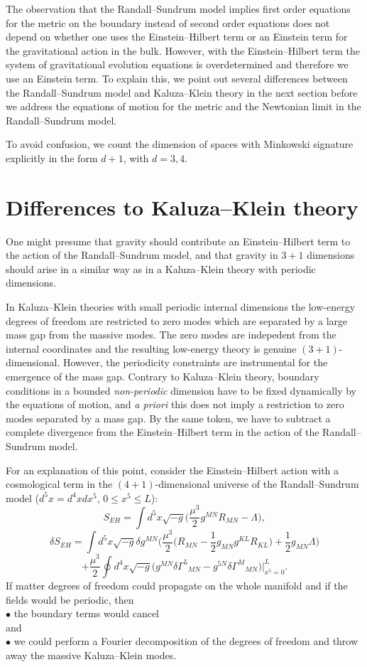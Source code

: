 \documentclass[12pt,fleqn]{article}
\newcommand{\be}{\begin{equation}}
\newcommand{\ee}{\end{equation}}
\begin{document}
The observation that the Randall--Sundrum model implies first order
equations for the metric on the boundary instead of second order
equations does not depend on whether one uses the Einstein--Hilbert
term or an Einstein term for the gravitational action in the bulk.
However, with the Einstein--Hilbert term the system of gravitational
evolution equations is overdetermined and therefore we use an Einstein
term. To explain this, we point out several differences
between the Randall--Sundrum model and Kaluza--Klein theory
in the next section before we address the equations
of motion for the metric and the Newtonian limit
in the Randall--Sundrum model.

To avoid confusion,
we count the dimension of spaces with Minkowski
signature explicitly in the form $d+1$, with $d=3,4$. 

\section{Differences to Kaluza--Klein theory}

One might presume that gravity should contribute an
Einstein--Hilbert term to the action of the Randall--Sundrum model,
and that 
 gravity in $3+1$ dimensions should arise 
in a similar way as in a Kaluza--Klein
theory with periodic dimensions.

In
Kaluza--Klein theories with small
periodic internal dimensions the low-energy degrees of freedom are restricted
to zero modes which are separated by a large mass gap from
the massive modes. 
The zero modes are indepedent from the internal coordinates
and the resulting low-energy theory is genuine $(3+1)$-dimensional.
However,
the periodicity constraints are instrumental
for the emergence of the mass gap. Contrary
to Kaluza--Klein theory, boundary conditions
in a bounded {\sl non-periodic} dimension have to be fixed
dynamically by the equations of motion, and {\it a priori} 
this does not imply
a restriction to zero modes separated by a mass gap.
By the same token, we have to subtract a complete divergence
from the Einstein--Hilbert term in the action of the
Randall--Sundrum model.

 For an explanation of this point, consider
the Einstein--Hilbert action with a cosmological term
in the $(4+1)$-dimensional universe
of the Randall--Sundrum model ($d^5x=d^4xdx^5$, $0\le x^5\le L$):
\[
S_{EH}=\int d^5x\sqrt{-g}\Big(\frac{\mu^3}{2}g^{MN}R_{MN}-\Lambda\Big),
\]
\be\label{dseh}
\delta S_{EH}=\int d^5x\sqrt{-g}\delta g^{MN}
\Bigg(\frac{\mu^3}{2}
\Big(R_{MN}-\frac{1}{2}g_{MN}g^{KL}R_{KL}\Big)
+\frac{1}{2}g_{MN}\Lambda\Bigg)
\ee
\[
+\frac{\mu^3}{2}\oint d^4x\sqrt{-g}\Big(g^{MN}\delta\Gamma^5{}_{MN}
-g^{5N}\delta\Gamma^M{}_{MN}\Big)\Big|_{x^5=0}^L.
\]
If matter degrees of freedom could propagate on the
whole manifold and if
the fields would be periodic, then\\
$\bullet$ the boundary terms would cancel\\
and\\
$\bullet$ we could perform a Fourier decomposition
of the degrees of freedom and throw away the massive Kaluza--Klein
modes.
\end{document}
